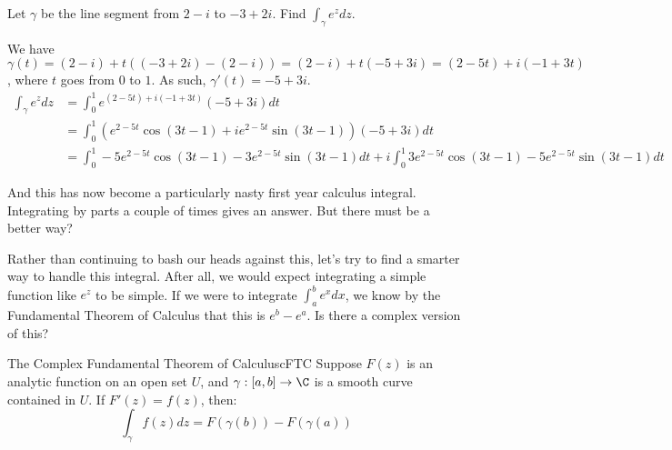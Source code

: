 \begin{ex}{}{} Let $\gamma$ be the line segment from $2 - i$ to $-3 + 2i$. Find $\int_\gamma e^zdz$.

We have $\gamma(t) = (2-i) + t((-3 + 2i) - (2-i)) = (	2-i) + t(-5 + 3i) = (2 - 5t) + i(-1 + 3t)$, where $t$ goes from $0$ to $1$. As such, $\gamma'(t) = -5 + 3i$.
\begin{align*}\int_{\gamma} e^z dz &= \int_{0}^1 e^{(2-5t) + i(-1 + 3t)}(-5 + 3i) dt\\
&= \int_{0}^1 (e^{2-5t}\cos(3t - 1) + ie^{2-5t}\sin(3t-1))(-5 + 3i)dt\\
&= \int_0^1 -5e^{2-5t}\cos(3t - 1) - 3e^{2-5t}\sin(3t-1) dt + i\int_0^1 3e^{2-5t}\cos(3t - 1)  - 5e^{2-5t}\sin(3t-1) dt
\end{align*}

And this has now become a particularly nasty first year calculus integral. Integrating by parts a couple of times gives an answer. But there must be a better way?
\end{ex}

Rather than continuing to bash our heads against this, let's try to find a smarter way to handle this integral. After all, we would expect integrating a simple function like $e^z$ to be simple. If we were to integrate $\int_{a}^b e^xdx$, we know by the Fundamental Theorem of Calculus that this is $e^b - e^a$. Is there a complex version of this?

\begin{thmbo}{The Complex Fundamental Theorem of Calculus}{cFTC}
Suppose $F(z)$ is an analytic function on an open set $U$, and $\gamma:[a,b]\rightarrow \C$ is a smooth curve contained in $U$. If $F'(z) = f(z)$, then:
$$\int_{\gamma} f(z)dz = F(\gamma(b)) - F(\gamma(a))$$
\end{thmbo}

